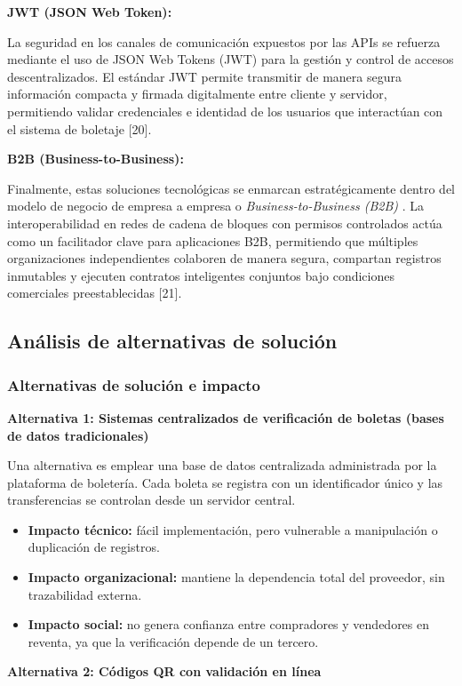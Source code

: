 \documentclass[12pt,a4paper]{article}
\begin{document}
\textbf{JWT (JSON Web Token):}

La seguridad en los canales de comunicación expuestos por las APIs se refuerza mediante el uso de JSON Web Tokens (JWT) para la gestión y control de accesos descentralizados. El estándar JWT permite transmitir de manera segura información compacta y firmada digitalmente entre cliente y servidor, permitiendo validar credenciales e identidad de los usuarios que interactúan con el sistema de boletaje [20].

\textbf{B2B (Business-to-Business):}

Finalmente, estas soluciones tecnológicas se enmarcan estratégicamente dentro del modelo de negocio de empresa a empresa o \textit{Business-to-Business (B2B)} . La interoperabilidad en redes de cadena de bloques con permisos controlados actúa como un facilitador clave para aplicaciones B2B, permitiendo que múltiples organizaciones independientes colaboren de manera segura, compartan registros inmutables y ejecuten contratos inteligentes conjuntos bajo condiciones comerciales preestablecidas [21].
\subsection{Análisis de alternativas de solución}
\subsubsection{Alternativas de solución e impacto}
\textbf{Alternativa 1: Sistemas centralizados de verificación de boletas (bases de datos tradicionales)}

Una alternativa es emplear una base de datos centralizada administrada por la
plataforma de boletería. Cada boleta se registra con un identificador único y las
transferencias se controlan desde un servidor central.

\begin{itemize}
    \item \textbf{Impacto técnico:} fácil implementación, pero vulnerable a
    manipulación o duplicación de registros.
    \item \textbf{Impacto organizacional:} mantiene la dependencia total del
    proveedor, sin trazabilidad externa.
    \item \textbf{Impacto social:} no genera confianza entre compradores y
    vendedores en reventa, ya que la verificación depende de un tercero.
\end{itemize}

\textbf{Alternativa 2: Códigos QR con validación en línea}
\end{document}
